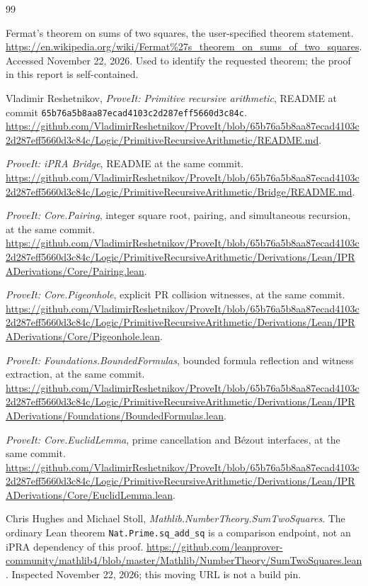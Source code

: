 \documentclass[11pt,letterpaper]{article}
\theoremstyle{definition}
\theoremstyle{remark}
\newcommand{\sha}{\texttt{65b76a5b8aa87ecad4103c2d287eff5660d3c84c}}
\begin{document}
\begin{thebibliography}{99}
\small
\raggedright
{}
Fermat's theorem on sums of two squares, the user-specified theorem
statement. \url{https://en.wikipedia.org/wiki/Fermat%27s_theorem_on_sums_of_two_squares}.
Accessed November 22, 2026. Used to identify the requested theorem;
the proof in this report is self-contained.

Vladimir Reshetnikov, \emph{ProveIt: Primitive recursive arithmetic},
README at commit \sha.
\url{https://github.com/VladimirReshetnikov/ProveIt/blob/65b76a5b8aa87ecad4103c2d287eff5660d3c84c/Logic/PrimitiveRecursiveArithmetic/README.md}.

\emph{ProveIt: iPRA Bridge}, README at the same commit.
\url{https://github.com/VladimirReshetnikov/ProveIt/blob/65b76a5b8aa87ecad4103c2d287eff5660d3c84c/Logic/PrimitiveRecursiveArithmetic/Bridge/README.md}.

\emph{ProveIt: Core.Pairing}, integer square root, pairing, and
simultaneous recursion, at the same commit.
\url{https://github.com/VladimirReshetnikov/ProveIt/blob/65b76a5b8aa87ecad4103c2d287eff5660d3c84c/Logic/PrimitiveRecursiveArithmetic/Derivations/Lean/IPRADerivations/Core/Pairing.lean}.

\emph{ProveIt: Core.Pigeonhole}, explicit PR collision witnesses, at the
same commit.
\url{https://github.com/VladimirReshetnikov/ProveIt/blob/65b76a5b8aa87ecad4103c2d287eff5660d3c84c/Logic/PrimitiveRecursiveArithmetic/Derivations/Lean/IPRADerivations/Core/Pigeonhole.lean}.

\emph{ProveIt: Foundations.BoundedFormulas}, bounded formula
reflection and witness extraction, at the same commit.
\url{https://github.com/VladimirReshetnikov/ProveIt/blob/65b76a5b8aa87ecad4103c2d287eff5660d3c84c/Logic/PrimitiveRecursiveArithmetic/Derivations/Lean/IPRADerivations/Foundations/BoundedFormulas.lean}.

\emph{ProveIt: Core.EuclidLemma}, prime cancellation and B\'ezout
interfaces, at the same commit.
\url{https://github.com/VladimirReshetnikov/ProveIt/blob/65b76a5b8aa87ecad4103c2d287eff5660d3c84c/Logic/PrimitiveRecursiveArithmetic/Derivations/Lean/IPRADerivations/Core/EuclidLemma.lean}.

Chris Hughes and Michael Stoll, \emph{Mathlib.NumberTheory.SumTwoSquares}.
The ordinary Lean theorem \texttt{Nat.Prime.sq\_add\_sq} is a comparison
endpoint, not an iPRA dependency of this proof.
\url{https://github.com/leanprover-community/mathlib4/blob/master/Mathlib/NumberTheory/SumTwoSquares.lean}.
Inspected November 22, 2026; this moving URL is not a build pin.
\end{thebibliography}
\end{document}
